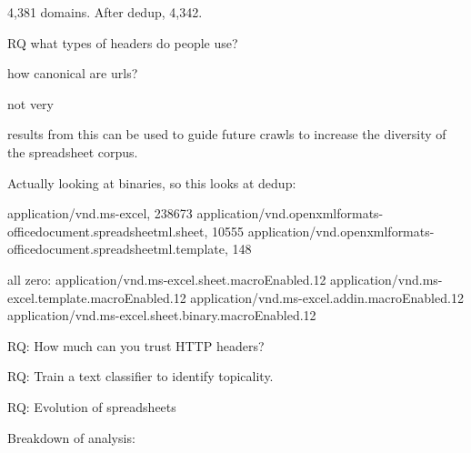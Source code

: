 \documentclass[conference]{IEEEtran}
\begin{document}
4,381 domains. After dedup, 4,342.

RQ what types of headers do people use?


how canonical are urls?

not very





results from this can be used to guide future crawls to increase the diversity of the spreadsheet corpus.



Actually looking at binaries, so this looks at dedup:

application/vnd.ms-excel, 238673
application/vnd.openxmlformats-officedocument.spreadsheetml.sheet, 10555
application/vnd.openxmlformats-officedocument.spreadsheetml.template, 148

all zero:
application/vnd.ms-excel.sheet.macroEnabled.12
application/vnd.ms-excel.template.macroEnabled.12
application/vnd.ms-excel.addin.macroEnabled.12
application/vnd.ms-excel.sheet.binary.macroEnabled.12

RQ: How much can you trust HTTP headers?

RQ: Train a text classifier to identify topicality.

RQ: Evolution of spreadsheets



Breakdown of analysis:
\end{document}
